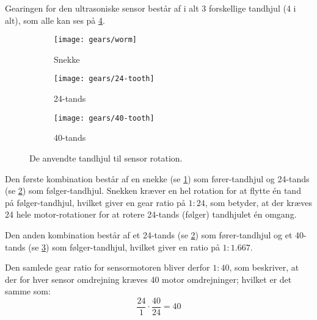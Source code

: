 Gearingen for den ultrasoniske sensor består af i alt 3 forskellige tandhjul (4 i alt), som alle kan ses på \cref{gearing:tandhjul}.

\begin{figure}[h] %
\centering
\begin{subfigure}[b]{.19\textwidth}
\centering
\texttt{[image: gears/worm]}
\caption{Snekke}
\label{gearing:snekke}
\end{subfigure}
\begin{subfigure}[b]{.19\textwidth}
\centering
\texttt{[image: gears/24-tooth]}
\caption{24-tands}
\label{gearing:24tand}
\end{subfigure}
\begin{subfigure}[b]{.19\textwidth}
\centering
\texttt{[image: gears/40-tooth]}
\caption{40-tands}
\label{gearing:40tand}
\end{subfigure}
\caption{De anvendte tandhjul til sensor rotation.}
\label{gearing:tandhjul}
\end{figure}

Den første kombination består af en snekke\cite{snekke} (se \cref{gearing:snekke}) som fører-tandhjul og 24-tands (se \cref{gearing:24tand}) som følger-tandhjul.
Snekken kræver en hel rotation for at flytte én tand på følger-tandhjul, hvilket giver en gear ratio på $1:24$, som betyder, at der kræves 24 hele motor-rotationer for at rotere 24-tands (følger) tandhjulet én omgang.

Den anden kombination består af et 24-tands (se \cref{gearing:24tand}) som fører-tandhjul og et 40-tands (se \cref{gearing:40tand}) som følger-tandhjul, hvilket giver en ratio på $1:1.667$.

Den samlede gear ratio for sensormotoren bliver derfor $1:40$, som beskriver, at der for hver sensor omdrejning kræves 40 motor omdrejninger; hvilket er det samme som:
$$\frac{24}{1} \cdot \frac{40}{24} = 40$$